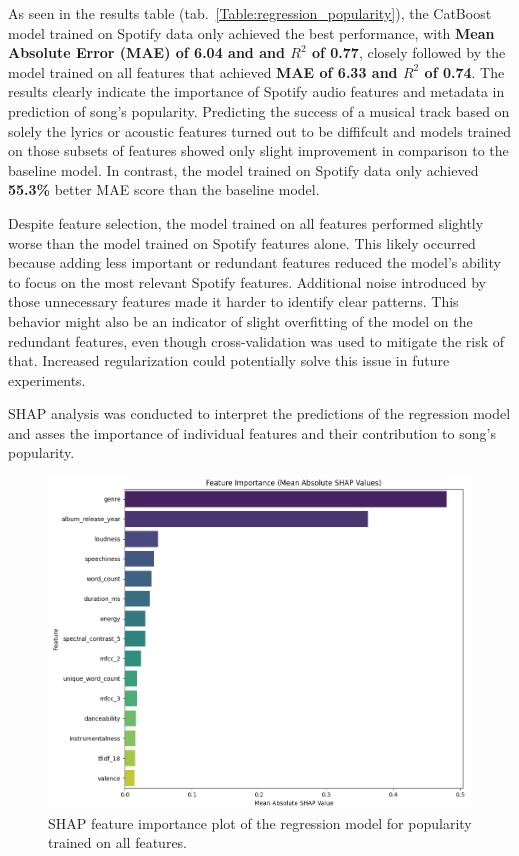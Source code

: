 As seen in the results table (tab.~\ref{Table:regression_popularity}), the
CatBoost model trained on Spotify data only achieved the best performance, with
\textbf{Mean Absolute Error (MAE) of \textbf{6.04} and and $R^2$ of 0.77},
closely followed by the model trained on all features that achieved \textbf{MAE
of 6.33 and $R^2$ of 0.74}. The results clearly indicate the importance of
Spotify audio features and metadata in prediction of song's popularity.
Predicting the success  of a musical track based on solely the lyrics or
acoustic features turned out to be diffifcult and models trained on those
subsets of features showed only slight improvement in comparison to the
baseline model. In contrast, the model trained on Spotify data only achieved
\textbf{55.3\%} better MAE score than the baseline model.

Despite feature selection, the model trained on all features performed slightly
worse than the model trained on Spotify features alone. This likely occurred
because adding less important or redundant features reduced the model's ability
to focus on the most relevant Spotify features. Additional noise introduced by
those unnecessary features made it harder to identify clear patterns. This
behavior might also be an indicator of slight overfitting of the model on the
redundant features, even though cross-validation was used to mitigate the risk
of that. Increased regularization could potentially solve this issue in
future experiments.


SHAP analysis was conducted to interpret the predictions of the regression
model and asses the importance of individual features and their contribution to
song's popularity.


\begin{center}
\begin{figure}[H]
  \centering
  \includegraphics[width=6in]{img/feature_importance_popularity_reg.png}
  \caption{SHAP feature importance plot of the regression model for popularity trained on all features.}
  \label{Figure:feature_importance_popularity_reg}
\end{figure}
\end{center}


